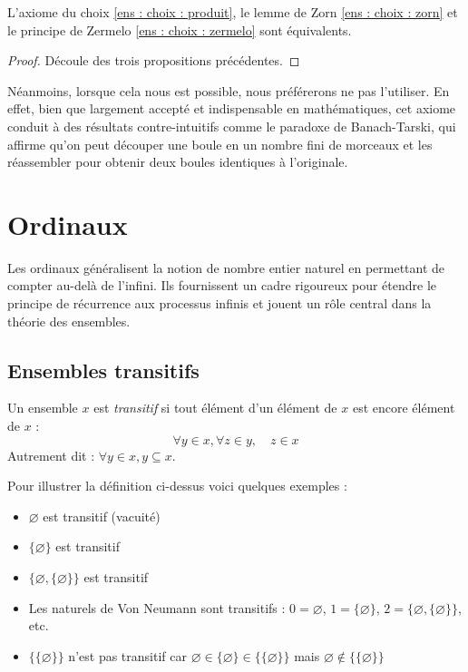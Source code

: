 \begin{theoreme}
    L'axiome du choix \ref{ens : choix : produit}, le lemme de Zorn \ref{ens : choix : zorn} et le principe de Zermelo \ref{ens : choix : zermelo} sont équivalents.
\end{theoreme}
\begin{proof}
    Découle des trois propositions précédentes.
\end{proof}
\begin{remarque}
	Néanmoins, lorsque cela nous est possible, nous préférerons ne pas l'utiliser. En effet, bien que largement accepté et indispensable en mathématiques, cet axiome conduit à des résultats contre-intuitifs comme le paradoxe de Banach-Tarski, qui affirme qu'on peut découper une boule en un nombre fini de morceaux et les réassembler pour obtenir deux boules identiques à l'originale.
\end{remarque}


\section{Ordinaux}
Les ordinaux généralisent la notion de nombre entier naturel en permettant de compter au-delà de l'infini. Ils fournissent un cadre rigoureux pour étendre le principe de récurrence aux processus infinis et jouent un rôle central dans la théorie des ensembles.
\subsection{Ensembles transitifs}

\begin{definition}
	Un ensemble $x$ est \emph{transitif} si tout élément d'un élément de $x$ est encore élément de $x$ :
	$$\forall y \in x, \forall z \in y,\quad  z \in x$$
	Autrement dit : $\forall y \in x, y \subseteq x$.
\end{definition}

\begin{exemple}
	Pour illustrer la définition ci-dessus voici quelques exemples :
	\begin{itemize}
		\item $\varnothing$ est transitif (vacuité)
		\item $\{\varnothing\}$ est transitif
		\item $\{\varnothing, \{\varnothing\}\}$ est transitif
		\item Les naturels de Von Neumann sont transitifs : $0 = \varnothing$, $1 = \{\varnothing\}$, $2 = \{\varnothing, \{\varnothing\}\}$, etc.
		\item $\{\{\varnothing\}\}$ n'est pas transitif car $\varnothing \in \{\varnothing\} \in \{\{\varnothing\}\}$ mais $\varnothing \notin \{\{\varnothing\}\}$
	\end{itemize}
\end{exemple}


